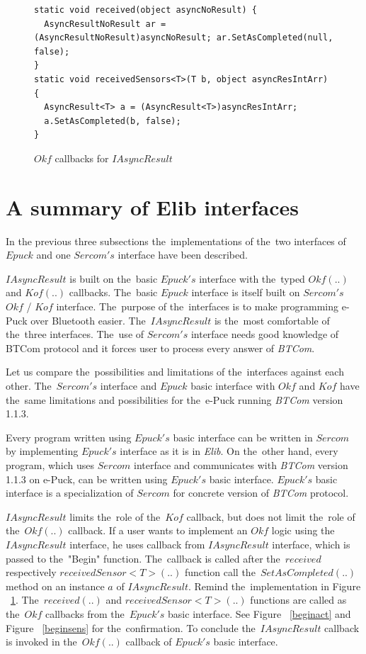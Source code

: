 \begin{figure}[!hbp]
\begin{lstlisting}
static void received(object asyncNoResult) {
  AsyncResultNoResult ar = (AsyncResultNoResult)asyncNoResult; ar.SetAsCompleted(null, false); 
}
static void receivedSensors<T>(T b, object asyncResIntArr) {
  AsyncResult<T> a = (AsyncResult<T>)asyncResIntArr;
  a.SetAsCompleted(b, false);
}
\end{lstlisting}	
\caption{$Okf$ callbacks for $IAsyncResult$} \label{Iokfs}
\end{figure}

\section{A summary of Elib interfaces}
\label{sec:suminterface}
  In the previous three subsections the~implementations of the~two interfaces of $Epuck$ 
  and one $Sercom's$ interface have been described.

  $IAsyncResult$ is built on the~basic $Epuck's$ interface with the~typed $Okf(..)$ and $Kof(..)$ callbacks. 
  The~basic $Epuck$ interface is itself built on $Sercom's$ $Okf$ / $Kof$ interface.
  The~purpose of the~interfaces is to make programming e-Puck over Bluetooth easier.
  The~$IAsyncResult$ is the~most comfortable of the~three interfaces. 
  The~use of $Sercom's$ interface needs good knowledge of BTCom protocol and 
  it forces user to process every answer of {\it BTCom}.

  Let us compare the~possibilities and limitations of the~interfaces against each other.
  The~$Sercom's$ interface and $Epuck$ basic interface with $Okf$ and $Kof$ 
  have the~same limitations and possibilities for the~e-Puck running {\it BTCom} version 1.1.3. 
  
  Every program written using $Epuck's$ basic interface can be written
  in $Sercom$ by implementing $Epuck's$ interface as it is in {\it Elib}.
  On the~other hand, every program, which uses $Sercom$ interface and communicates with {\it BTCom}
  version 1.1.3 on e-Puck, can be written using $Epuck's$ basic interface. 
  $Epuck's$ basic interface is a specialization of $Sercom$ for concrete version of {\it BTCom}
  protocol.

  $IAsyncResult$ limits the~role of the~$Kof$ callback, but does not limit the~role of the~$Okf(..)$ callback.
  If a user wants to implement an $Okf$ logic using the~$IAsyncResult$ interface, he uses callback from $IAsyncResult$
  interface, which is passed to the~"Begin" function.
  The~callback is called after the~$received$ respectively $receivedSensor<T>(..)$ function  call 
  the~$SetAsCompleted(..)$ method on an instance $a$ of $IAsyncResult$. 
  Remind the~implementation in Figure ~\ref{Iokfs}.
  The~$received(..)$ and $receivedSensor<T>(..)$ functions are called as the~$Okf$ callbacks
  from the~$Epuck's$ basic interface.
  See Figure ~\ref{beginact} and Figure ~\ref{beginsens} for the~confirmation.
  To conclude the~$IAsyncResult$ callback is invoked in the~$Okf(..)$ callback of $Epuck's$ basic interface.

